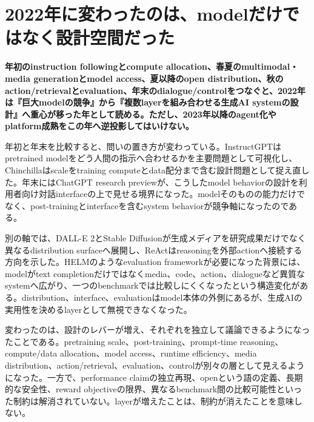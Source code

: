 \section{2022年に変わったのは、modelだけではなく設計空間だった}
\label{pkg:annual-synthesis}
\noindent\textbf{年初のinstruction followingとcompute allocation、春夏のmultimodal・media generationとmodel access、夏以降のopen distribution、秋のaction/retrievalとevaluation、年末のdialogue/controlをつなぐと、2022年は『巨大modelの競争』から『複数layerを組み合わせる生成AI systemの設計』へ重心が移った年として読める。ただし、2023年以降のagent化やplatform成熟をこの年へ逆投影してはいけない。}\autocite{src-16a1a1dc486e,src-1e362767e63c,src-26aadbc0393f,src-27297a80fac0,src-2832ee43ab8f,src-2c38d2f354fa,src-6ffa5c4e64ca,src-811e1008822e,src-86ce6205a4ed,src-87477ad8b476,src-929080260e16,src-bc1a61aec959,src-e58f1e9c8754,src-e8da8e8f02bc}

年初と年末を比較すると、問いの置き方が変わっている。InstructGPTはpretrained modelをどう人間の指示へ合わせるかを主要問題として可視化し、Chinchillaはscaleをtraining computeとdata配分まで含む設計問題として捉え直した。年末にはChatGPT research previewが、こうしたmodel behaviorの設計を利用者向け対話interfaceの上で見せる境界になった。modelそのものの能力だけでなく、post-trainingとinterfaceを含むsystem behaviorが競争軸になったのである。\autocite{src-6ffa5c4e64ca,src-87477ad8b476,src-bc1a61aec959,src-e58f1e9c8754,src-e8da8e8f02bc}


別の軸では、DALL-E 2とStable Diffusionが生成メディアを研究成果だけでなく異なるdistribution surfaceへ展開し、ReActはreasoningを外部actionへ接続する方向を示した。HELMのようなevaluation frameworkが必要になった背景には、modelがtext completionだけではなくmedia、code、action、dialogueなど異質なsystemへ広がり、一つのbenchmarkでは比較しにくくなったという構造変化がある。distribution、interface、evaluationはmodel本体の外側にあるが、生成AIの実用性を決めるlayerとして無視できなくなった。\autocite{src-16a1a1dc486e,src-1e362767e63c,src-26aadbc0393f,src-27297a80fac0,src-2832ee43ab8f,src-2c38d2f354fa,src-811e1008822e,src-86ce6205a4ed,src-929080260e16}


変わったのは、設計のレバーが増え、それぞれを独立して議論できるようになったことである。pretraining scale、post-training、prompt-time reasoning、compute/data allocation、model access、runtime efficiency、media distribution、action/retrieval、evaluation、controlが別々の層として見えるようになった。一方で、performance claimの独立再現、openという語の定義、長期的な安全性、reward objectiveの限界、異なるbenchmark間の比較可能性といった制約は解消されていない。layerが増えたことは、制約が消えたことを意味しない。\autocite{src-1e362767e63c,src-26aadbc0393f,src-2832ee43ab8f,src-6ffa5c4e64ca,src-87477ad8b476,src-e58f1e9c8754,src-e8da8e8f02bc}


